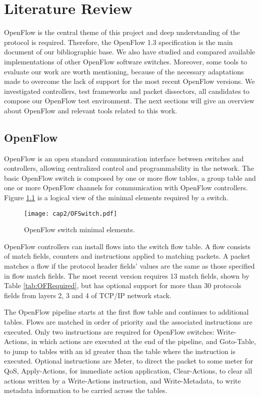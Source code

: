 \chapter{Literature Review}
\label{cap:cap02}

OpenFlow is the central theme of this project and deep understanding of the protocol is required. Therefore, the OpenFlow 1.3 specification \cite{ofspec13} is the main document of our bibliographic base. We also have studied and compared available implementations of other OpenFlow software switches. Moreover, some tools to evaluate our work are worth mentioning, because of the necessary adaptations made to overcome the lack of support for the most recent OpenFlow versions. We investigated controllers, test frameworks and packet dissectors, all candidates to compose our OpenFlow test environment. The next sections will give an overview about OpenFlow and relevant tools related to this work. 

\section{OpenFlow}
\label{sec:sec21}

OpenFlow is an open standard communication interface between switches and controllers, allowing centralized control and programmability in the network. The basic OpenFlow switch is composed by one or more flow tables, a group table and one or more OpenFlow channels for communication with OpenFlow controllers. Figure \ref{fig:logicalswitch} is a logical view of the minimal elements required by a switch. 

\begin{figure}[h!]
\centering
\texttt{[image: cap2/OFSwitch.pdf]}
\caption{OpenFlow switch minimal elements.}
\label{fig:logicalswitch}
\end{figure}
\pagebreak

OpenFlow controllers can install flows into the switch flow table. A flow consists of match fields, counters and instructions applied to matching packets. A packet matches a flow if the protocol header fields' values are the same as those specified in flow match fields. The most recent version requires 13 match fields, shown by Table \ref{tab:OFRequired}, but has optional support for more than 30 protocols fields from layers 2, 3 and 4 of TCP/IP network stack.

The OpenFlow pipeline starts at the first flow table and continues to additional tables. Flows are matched in order of priority and the associated instructions are executed. Only two instructions are required for OpenFlow switches: Write-Actions, in which actions are executed at the end of the pipeline, and Goto-Table, to jump to tables with an id greater than the table where the instruction is executed. Optional instructions are Meter, to direct the packet to some meter for QoS, Apply-Actions, for immediate action application, Clear-Actions, to clear all actions written by a Write-Actions instruction, and Write-Metadata, to write metadata information to be carried across the tables. 

